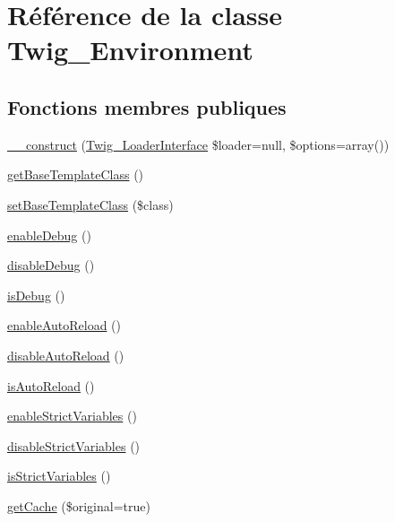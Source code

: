 \hypertarget{class_twig___environment}{}\section{Référence de la classe Twig\+\_\+\+Environment}
\label{class_twig___environment}
\subsection*{Fonctions membres publiques}
\begin{DoxyCompactItemize}
\item 
\hyperlink{class_twig___environment_aeb7b9fc79ec16f0d18b8685a9302873a}{\+\_\+\+\_\+construct} (\hyperlink{interface_twig___loader_interface}{Twig\+\_\+\+Loader\+Interface} \$loader=null, \$options=array())
\item 
\hyperlink{class_twig___environment_a9f3561c0378f53108aa9673bdd3c63a0}{get\+Base\+Template\+Class} ()
\item 
\hyperlink{class_twig___environment_a923e6b2ef89e647030c100214896548c}{set\+Base\+Template\+Class} (\$class)
\item 
\hyperlink{class_twig___environment_a942b0cfbc1005c9bb0a5f2b0f7d25a25}{enable\+Debug} ()
\item 
\hyperlink{class_twig___environment_ad8fe55ee3d188c1b0d71585653debfef}{disable\+Debug} ()
\item 
\hyperlink{class_twig___environment_a017d21b4d0e1ee6f9cdd9d805793f076}{is\+Debug} ()
\item 
\hyperlink{class_twig___environment_af27b2d02a1bd3d7dc0d2e72dff771cab}{enable\+Auto\+Reload} ()
\item 
\hyperlink{class_twig___environment_a46062846c7f95b6b290e36d90c296491}{disable\+Auto\+Reload} ()
\item 
\hyperlink{class_twig___environment_a7ba43ac4c9bdd0aefcd5140e4ea87a08}{is\+Auto\+Reload} ()
\item 
\hyperlink{class_twig___environment_afe904f5f015cd40f965d5f524611c3fa}{enable\+Strict\+Variables} ()
\item 
\hyperlink{class_twig___environment_a91b21a6aa5aed10b4f89888eaadefc80}{disable\+Strict\+Variables} ()
\item 
\hyperlink{class_twig___environment_ab39d5897ee5022ecc92032d769b9c60c}{is\+Strict\+Variables} ()
\item 
\hyperlink{class_twig___environment_a060984befe7f03db2d97afd3cf0d6d58}{get\+Cache} (\$original=true)
\item 

\end{DoxyCompactItemize}
